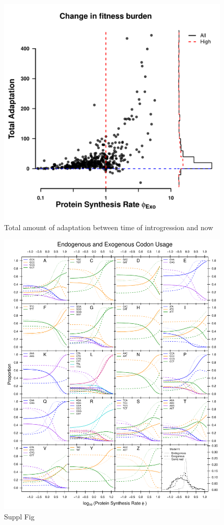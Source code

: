\documentclass[12pt]{article}
\begin{document}
\begin{figure}[H]
     \centering
	\includegraphics[width=\textwidth]{img/adaptation_total.pdf}
	\caption{Total amount of adaptation between time of introgression and now}
	\label{fig:adapt_tot}
\end{figure}

\clearpage
\begin{figure}[H]
     \centering
	\includegraphics[width=\textwidth]{img/CUB_cleft_main.pdf}
	\caption{Suppl Fig}
	\label{fig:cub_all_sets}
\end{figure}
\end{document}
